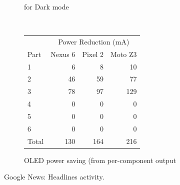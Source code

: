 \begin{figure}[th]
\begin{subfigure}[]{\columnwidth}
		\caption{\name for Dark mode}
	\end{subfigure}
	\\
	\begin{subfigure}[]{\columnwidth}
	\centering
	{ \small
	\begin{tabular}{ | l | r | r | r | }
		\hline
		     & \multicolumn{3}{|c|}{Power Reduction (mA)}\\
		\cline{2-4}
                Part & Nexus 6 & Pixel 2 & Moto Z3 \\
		\hline
		1 &   6  &   8 &   10  \\
		2 &  46  &  59 &   77  \\
		3 &  78  &  97 &  129  \\
		4 &   0  &   0 &    0  \\
		5 &   0  &   0 &    0  \\
		6 &   0  &   0 &    0  \\
		\hline
		Total   & 130 & 164 & 216  \\
		\hline
	\end{tabular}
	}
	\caption{OLED power saving (from \name per-component output}		
        \vspace{-0.1in}
	\end{subfigure}
	\caption{Google News: Headlines activity.}
        \vspace{-0.20in}
	\label{fig:case_study_news}
\end{figure}

\fi

